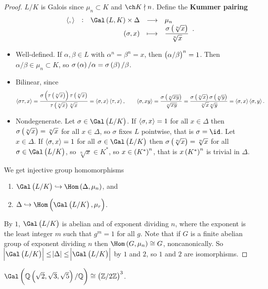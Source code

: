 \begin{proof}
$ L / K $ is Galois since $ \mu_n \subset K $ and $ \ch K \nmid n $. Define the \textbf{Kummer pairing}
$$ \function[\abr{,}]{\Gal\br{L, K} \times \Delta}{\mu_n}{\br{\sigma, x}}{\dfrac{\sigma\br{\sqrt[n]{x}}}{\sqrt[n]{x}}}. $$
\begin{itemize}
\item Well-defined. If $ \alpha, \beta \in L $ with $ \alpha^n = \beta^n = x $, then $ \br{\alpha / \beta}^n = 1 $. Then $ \alpha / \beta \in \mu_n \subset K $, so $ \sigma\br{\alpha} / \alpha = \sigma\br{\beta} / \beta $.
\item Bilinear, since
$$ \abr{\sigma\tau, x} = \dfrac{\sigma\br{\tau\br{\sqrt[n]{x}}}\tau\br{\sqrt[n]{x}}}{\tau\br{\sqrt[n]{x}}\sqrt[n]{x}} = \abr{\sigma, x}\abr{\tau, x}, \qquad \abr{\sigma, xy} = \dfrac{\sigma\br{\sqrt[n]{xy}}}{\sqrt[n]{xy}} = \dfrac{\sigma\br{\sqrt[n]{x}}\sigma\br{\sqrt[n]{y}}}{\sqrt[n]{x}\sqrt[n]{y}} = \abr{\sigma, x}\abr{\sigma, y}. $$
\item Nondegenerate. Let $ \sigma \in \Gal\br{L / K} $. If $ \left\langle \sigma, x \right\rangle = 1 $ for all $ x \in \Delta $ then $ \sigma\br{\sqrt[n]{x}} = \sqrt[n]{x} $ for all $ x \in \Delta $, so $ \sigma $ fixes $ L $ pointwise, that is $ \sigma = \id $. Let $ x \in \Delta $. If $ \left\langle \sigma, x \right\rangle = 1 $ for all $ \sigma \in \Gal\br{L / K} $ then $ \sigma\br{\sqrt[n]{x}} = \sqrt[n]{x} $ for all $ \sigma \in \Gal\br{L / K} $, so $ \sqrt[n]{x} \in K^* $, so $ x \in \br{K^*}^n $, that is $ x\br{K^*}^n $ is trivial in $ \Delta $.
\end{itemize}
We get injective group homomorphisms
\begin{enumerate}
\item $ \Gal\br{L / K} \hookrightarrow \Hom\br{\Delta, \mu_n} $, and
\item $ \Delta \hookrightarrow \Hom\br{\Gal\br{L / K}, \mu_r} $.
\end{enumerate}
By $ 1 $, $ \Gal\br{L / K} $ is abelian and of exponent dividing $ n $, where the exponent is the least integer $ m $ such that $ g^m = 1 $ for all $ g $. Note that if $ G $ is a finite abelian group of exponent dividing $ n $ then $ \Hom\br{G, \mu_n} \cong G $, noncanonically. So $ \abs{\Gal\br{L / K}} \le \abs{\Delta} \le \abs{\Gal\br{L / K}} $ by $ 1 $ and $ 2 $, so $ 1 $ and $ 2 $ are isomorphisms.
\end{proof}

\begin{example*}
$ \Gal\br{\QQ\br{\sqrt{2}, \sqrt{3}, \sqrt{5}} / \QQ} \cong \br{\ZZ / 2\ZZ}^3 $.
\end{example*}

